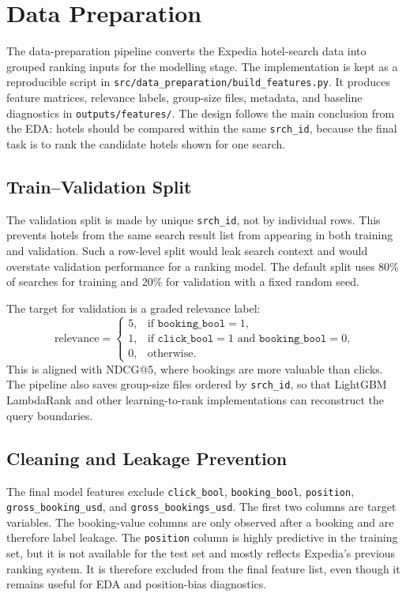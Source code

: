 \section{Data Preparation}
\label{sec:dataprep}

The data-preparation pipeline converts the Expedia hotel-search data into grouped ranking inputs for the modelling stage. The implementation is kept as a reproducible script in \texttt{src/data\_preparation/build\_features.py}. It produces feature matrices, relevance labels, group-size files, metadata, and baseline diagnostics in \texttt{outputs/features/}. The design follows the main conclusion from the EDA: hotels should be compared within the same \texttt{srch\_id}, because the final task is to rank the candidate hotels shown for one search.

\subsection{Train--Validation Split}

The validation split is made by unique \texttt{srch\_id}, not by individual rows. This prevents hotels from the same search result list from appearing in both training and validation. Such a row-level split would leak search context and would overstate validation performance for a ranking model. The default split uses 80\% of searches for training and 20\% for validation with a fixed random seed.

The target for validation is a graded relevance label:
\[
\text{relevance} =
\begin{cases}
5, & \text{if } \texttt{booking\_bool}=1,\\
1, & \text{if } \texttt{click\_bool}=1 \text{ and } \texttt{booking\_bool}=0,\\
0, & \text{otherwise.}
\end{cases}
\]
This is aligned with NDCG@5, where bookings are more valuable than clicks. The pipeline also saves group-size files ordered by \texttt{srch\_id}, so that LightGBM LambdaRank and other learning-to-rank implementations can reconstruct the query boundaries.

\subsection{Cleaning and Leakage Prevention}

The final model features exclude \texttt{click\_bool}, \texttt{booking\_bool}, \texttt{position}, \texttt{gross\_booking\_usd}, and \texttt{gross\_bookings\_usd}. The first two columns are target variables. The booking-value columns are only observed after a booking and are therefore label leakage. The \texttt{position} column is highly predictive in the training set, but it is not available for the test set and mostly reflects Expedia's previous ranking system. It is therefore excluded from the final feature list, even though it remains useful for EDA and position-bias diagnostics.

